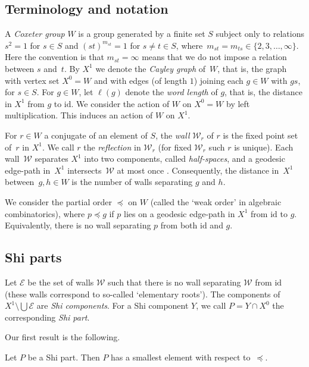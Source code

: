 \documentclass[Unicode,ALCO]{cedram}
\newcommand{\id}{\mathrm{id}}
\begin{document}
\subsection*{Terminology and notation} 

A \emph{Coxeter group} $W$ is a group generated by a finite set $S$ subject only to relations $s^2=1$
for $s\in S$ and $(st)^{m_{st}}=1$ for $s\neq t\in S$, where~$m_{st}=m_{ts}\in \{2,3,\ldots,\infty\}$. Here the convention is that $m_{st}=\infty$
means that we do not impose a relation between $s$ and~$t$. By $X^1$ we denote the \emph{Cayley graph} of~$W$, that is, the graph with vertex set $X^0=W$
and with edges (of length $1$) joining each $g\in W$ with $gs$, for $s\in S$. For $g\in W$, let $\ell(g)$ denote the \emph{word length} of $g$, that is, the distance in $X^1$ from $g$ to $\id$.
We
consider the action of $W$ on $X^0=W$ by left multiplication. This induces an action of $W$ on $X^1$.

For $r\in W$ a conjugate of an element of $S$, the \emph{wall}
$\mathcal W_r$ of $r$ is the fixed point set of~$r$ in $X^1$. We call $r$ the \emph{reflection} in $\mathcal W_r$ (for fixed $\mathcal W_r$ such $r$
is unique). Each wall~$\mathcal W$ separates $X^1$ into two components, called \emph{half-spaces}, and a geodesic edge-path in~$X^1$ intersects~$\mathcal W$ at most once \cite[Lem~2.5]{Ronan_2009}. Consequently, the distance in~$X^1$ between~$g,h\in W$ is the number of walls separating $g$ and $h$. 

We consider the partial order $\preceq$ on $W$ (called the `weak order' in algebraic combinatorics), where $p \preceq g$ if $p$ lies on a geodesic edge-path in $X^1$ from $\id$ to $g$. Equivalently, there is no wall separating $p$ from both $\id$ and $g$.

\subsection*{Shi parts} 

Let $\mathcal E$ be the set of walls $\mathcal W$ such that there is no wall separating $\mathcal W$ from  $\id$ (these walls correspond to so-called `elementary roots'). The components of~$X^1 \setminus \bigcup \mathcal E$ are \emph{Shi components}. For a Shi component $Y$, we call $P = Y \cap X^0$ the corresponding \emph{Shi part}.

Our first result is the following.

\begin{thm} 
	\label{thm:Shi}
	Let $P$ be a Shi part. Then $P$ has a smallest element with respect to~$\preceq$.
\end{thm}
\end{document}
